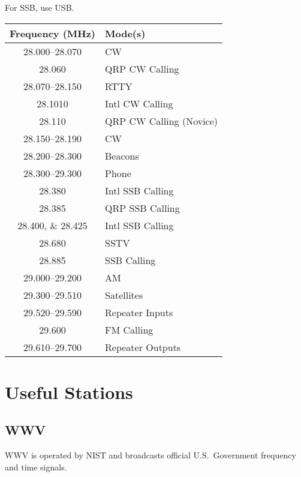 \documentclass[11pt, onecolumn, table]{article}
\begin{document}
For SSB, use USB.
\begin{center}
  \begin{tabular}{S l}
    {Frequency (\si{\MHz})}			& Mode(s)					\\
    \midrule
    \numrange{28.000}{28.070}		& CW						\\
    \num{28.060}					& QRP CW Calling			\\
    \numrange{28.070}{28.150}		& RTTY						\\
    \num{28.1010}					& Intl CW Calling			\\
    \num{28.110}					& QRP CW Calling (Novice)	\\
    \numrange{28.150}{28.190}		& CW						\\
    \numrange{28.200}{28.300}		& Beacons					\\
    \numrange{28.300}{29.300}		& Phone						\\
    \num{28.380}					& Intl SSB Calling			\\
    \num{28.385}					& QRP SSB Calling			\\
    \numlist{28.400;28.425}			& Intl SSB Calling			\\
    \num{28.680}					& SSTV						\\
    \num{28.885}					& SSB Calling				\\
    \numrange{29.000}{29.200}		& AM						\\
    \numrange{29.300}{29.510}		& Satellites				\\
    \numrange{29.520}{29.590}		& Repeater Inputs			\\
    \num{29.600}					& FM Calling				\\
    \numrange{29.610}{29.700}		& Repeater Outputs			\\
  \end{tabular}
\end{center}

\clearpage
\clearpage


\section{Useful Stations}


\subsection{WWV}
WWV is operated by NIST and broadcasts official U.S.\ Government frequency and time signals.
\end{document}
